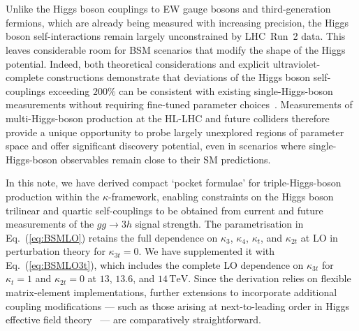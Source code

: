 \documentclass{SciPost}
\begin{document}
\FloatBarrier

\section{\textbf{}}
\label{sec:conclusions}

Unlike the Higgs boson couplings to EW gauge bosons and third-generation fermions, which are already being measured with increasing precision, the Higgs boson self-interactions remain largely unconstrained by LHC~Run~2 data. This leaves considerable room for BSM scenarios that modify the shape of the Higgs potential. Indeed, both theoretical considerations and explicit ultraviolet-complete constructions demonstrate that deviations of the Higgs boson self-couplings exceeding $200\%$ can be consistent with existing single-Higgs-boson measurements without requiring fine-tuned parameter choices~\cite{Durieux:2022hbu}. Measurements of multi-Higgs-boson production at the HL-LHC and future colliders therefore provide a unique opportunity to probe largely unexplored regions of parameter space and offer significant discovery potential, even in scenarios where single-Higgs-boson observables remain close to their SM predictions.

In this note, we have derived compact `pocket formulae' for triple-Higgs-boson production within the $\kappa$-framework, enabling constraints on the Higgs boson trilinear and quartic self-couplings to be obtained from current and future measurements of the $gg \to 3h$ signal strength. The parametrisation in Eq.~(\ref{eq:BSMLO}) retains the full dependence on $\kappa_3$, $\kappa_4$, $\kappa_t$, and $\kappa_{2t}$ at LO in perturbation theory for $\kappa_{3t}=0$. We have supplemented it with Eq.~(\ref{eq:BSMLO3t}), which includes the complete LO dependence on $\kappa_{3t}$ for $\kappa_t=1$ and $\kappa_{2t}=0$ at $13$, $13.6$, and $14\,\mathrm{TeV}$. Since the derivation relies on flexible matrix-element implementations, further extensions to incorporate additional coupling modifications --- such as those arising at next-to-leading order in Higgs effective field theory~\cite{Brivio:2025sib} --- are comparatively straightforward.
\end{document}
